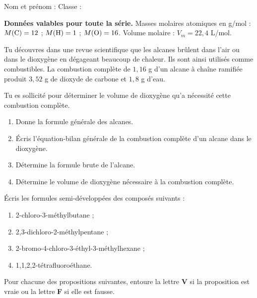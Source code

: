 \newcommand{\matiere}{Chimie : les alcanes}




\vspace{2pt}
Nom et prénom : \dotfill \quad Classe : \dotfill

\begin{donnees}
\textbf{Données valables pour toute la série.} Masses molaires atomiques en g/mol :
$M(\ce{C}) = 12$ ; $M(\ce{H}) = 1$ ; $M(\ce{O}) = 16$.
Volume molaire : $V_m = 22,4$ L/mol.
\end{donnees}

Tu découvres dans une revue scientifique que les alcanes brûlent dans l'air ou dans le dioxygène en
dégageant beaucoup de chaleur. Ils sont ainsi utilisés comme combustibles. La combustion complète de
$1,16$ g d'un alcane à chaîne ramifiée produit $3,52$ g de dioxyde de carbone et $1,8$ g d'eau.

Tu es sollicité pour déterminer le volume de dioxygène qu'a nécessité cette combustion complète.
\begin{enumerate}
  \item Donne la formule générale des alcanes.
  \item Écris l'équation-bilan générale de la combustion complète d'un alcane dans le dioxygène.
  \item Détermine la formule brute de l'alcane.
  \item Détermine le volume de dioxygène nécessaire à la combustion complète.
\end{enumerate}

Écris les formules semi-développées des composés suivants :
\begin{enumerate}[label=\alph*.]
  \item 2-chloro-3-méthylbutane ;
  \item 2,3-dichloro-2-méthylpentane ;
  \item 2-bromo-4-chloro-3-éthyl-3-méthylhexane ;
  \item 1,1,2,2-tétrafluoroéthane.
\end{enumerate}

Pour chacune des propositions suivantes, entoure la lettre \textbf{V} si la proposition est vraie ou
la lettre \textbf{F} si elle est fausse.

